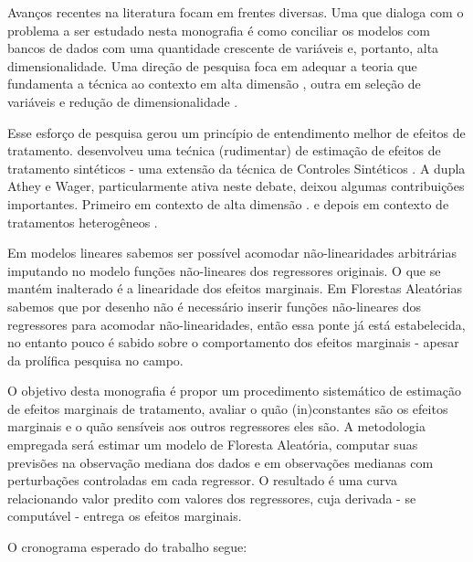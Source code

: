 Avanços recentes na literatura focam em frentes diversas. Uma que dialoga com o problema a ser estudado nesta monografia é como conciliar os modelos com bancos de dados com uma quantidade crescente de variáveis e, portanto, alta dimensionalidade. Uma direção de pesquisa foca em adequar a teoria que fundamenta a técnica ao contexto em alta dimensão \citep{athey2019generalized}, outra em seleção de variáveis e redução de dimensionalidade \citep{hastie2015statistical}. 

Esse esforço de pesquisa gerou um princípio de entendimento melhor de efeitos de tratamento. \cite{ikonen2016machine} desenvolveu uma tećnica (rudimentar) de estimação de efeitos de tratamento sintéticos - uma extensão da técnica de Controles Sintéticos \citep{abadie2010synthetic}. A dupla Athey e Wager, particularmente ativa neste debate, deixou algumas contribuições importantes. Primeiro em contexto de alta dimensão \citep{athey2018approximate}. e depois em contexto de tratamentos heterogêneos \citep{wager2018estimation}. 

Em modelos lineares sabemos ser possível acomodar não-linearidades arbitrárias imputando no modelo funções não-lineares dos regressores originais. O que se mantém inalterado é a linearidade dos efeitos marginais. Em Florestas Aleatórias sabemos que por desenho não é necessário inserir funções não-lineares dos regressores para acomodar não-linearidades, então essa ponte já está estabelecida, no entanto pouco é sabido sobre o comportamento dos efeitos marginais - apesar da prolífica pesquisa no campo.

O objetivo desta monografia é propor um procedimento sistemático de estimação de efeitos marginais de tratamento, avaliar o quão (in)constantes são os efeitos marginais e o quão sensíveis aos outros regressores eles são. A metodologia empregada será estimar um modelo de Floresta Aleatória, computar suas previsões na observação mediana dos dados e em observações medianas com perturbações controladas em cada regressor. O resultado é uma curva relacionando valor predito com valores dos regressores, cuja derivada - se computável - entrega os efeitos marginais.

O cronograma esperado do trabalho segue:

